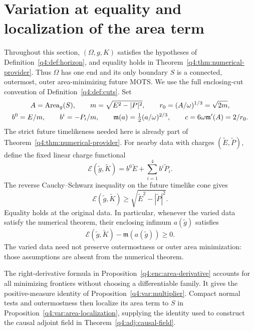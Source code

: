 \section{Variation at equality and localization of the area term}
\label{q4:var:section}

Throughout this section, $(\Omega,g,K)$ satisfies the hypotheses of
Definition~\ref{q4:def:horizon}, and equality holds in
Theorem~\ref{q4:thm:numerical-provider}. Thus $\Omega$ has one end and its only boundary
$S$ is a connected, outermost, outer area-minimizing future MOTS. We use the
full enclosing-cut convention of Definition~\ref{q4:def:cuts}. Set
\begin{equation}
\begin{gathered}
 A=\operatorname{Area}_g(S),\qquad m=\sqrt{E^2-|P|^2},\qquad
 r_0=(A/\omega)^{1/3}=\sqrt{2m},\\
 b^0=E/m,\qquad b^i=-P_i/m,\qquad
 \mathfrak m(a)=\tfrac12(a/\omega)^{2/3},\qquad
 c=6\omega\mathfrak m'(A)=2/r_0.
\end{gathered}
\label{q4:var:constants}
\end{equation}
The strict future timelikeness needed here is already part of
Theorem~\ref{q4:thm:numerical-provider}. For nearby data with charges
$(\widetilde E,\widetilde P)$, define the fixed linear charge functional
\[
 \mathcal E(\widetilde g,\widetilde K)
   =b^0\widetilde E+\sum_{i=1}^4b^i\widetilde P_i.
\]
The reverse Cauchy--Schwarz inequality on the future timelike cone gives
\begin{equation}
 \mathcal E(\widetilde g,\widetilde K)
 \ge \sqrt{\widetilde E^2-|\widetilde P|^2}.
\label{q4:var:supporting-charge}
\end{equation}
Equality holds at the original data. In particular, whenever the varied
data satisfy the numerical theorem, their enclosing infimum
$a(\widetilde g)$ satisfies
\begin{equation}
 \mathcal E(\widetilde g,\widetilde K)
       -\mathfrak m(a(\widetilde g))\ge0.
\label{q4:var:nonnegative-defect}
\end{equation}
The varied data need not preserve outermostness or outer area minimization:
those assumptions are absent from the numerical theorem.

The right-derivative formula in
Proposition~\ref{q4:enc:area-derivative} accounts for all minimizing
frontiers without choosing a differentiable family. It gives the
positive-measure identity of Proposition~\ref{q4:var:multiplier}.
Compact normal tests and outermostness then localize its area term to $S$
in Proposition~\ref{q4:var:area-localization}, supplying the identity used
to construct the causal adjoint field in Theorem~\ref{q4:adj:causal-field}.

